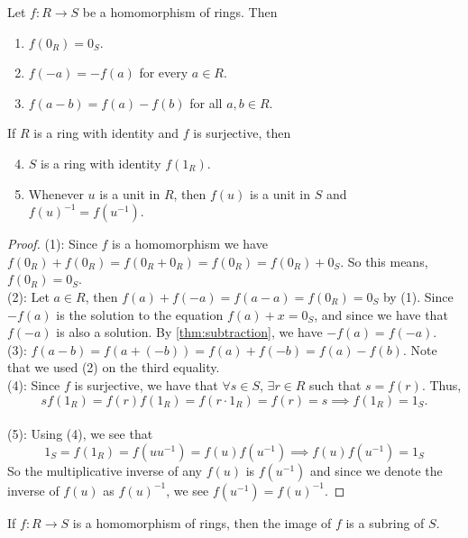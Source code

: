 \documentclass[../main.tex]{subfiles}
\begin{document}
\begin{theorem}\label{thm:homomorphism property}
Let $f: R \to S$ be a homomorphism of rings. Then
\begin{enumerate}
    \item $f(0_R) = 0_S$.
    \item $f(-a) = -f(a)$ for every $a \in R$.
    \item $f(a - b) = f(a) - f(b)$ for all $a, b \in R$.
\end{enumerate}
If $R$ is a ring with identity and $f$ is surjective, then
\begin{enumerate}
    \setcounter{enumi}{3}
    \item $S$ is a ring with identity $f(1_R)$.
    \item Whenever $u$ is a unit in $R$, then $f(u)$ is a unit in $S$ and $f(u)^{-1} = f(u^{-1})$.
\end{enumerate}
\end{theorem}

\begin{proof}
(1): Since $f$ is a homomorphism we have $f(0_R) + f(0_R) = f(0_R + 0_R) = f(0_R) = f(0_R) + 0_S$.
So this means, $f(0_R) = 0_S$.\\
(2): Let $a \in R$, then $f(a) + f(-a) = f(a-a) = f(0_R) = 0_S$ by (1).
Since $-f(a)$ is the solution to the equation $f(a) + x = 0_S$, and since 
we have that $f(-a)$ is also a solution. By \ref{thm:subtraction}, we have $-f(a) = f(-a)$.\\
(3): $ f(a-b) = f(a + (-b)) = f(a) + f(-b) = f(a) - f(b)$. Note that we used (2) on the third equality.\\
(4): Since $f$ is surjective, we have that $\forall s \in S$, $\exists r \in R$ such that
$s = f(r)$. Thus, \[
sf(1_R) = f(r)f(1_R) = f(r\cdot 1_R) = f(r) = s \implies f(1_R) = 1_S.
\]\\
(5): Using (4), we see that\[
1_S = f(1_R) = f(uu^{-1}) = f(u)f(u^{-1}) \implies f(u)f(u^{-1}) = 1_S
\]
So the multiplicative inverse of any $f(u)$ is $f(u^{-1})$ and since 
we denote the inverse of $f(u)$ as $f(u)^{-1}$, we see $f(u^{-1}) = f(u)^{-1}$.




\end{proof}











\begin{corollary}
If $f: R \to S$ is a homomorphism of rings, then the image of $f$ is a subring of $S$.
\end{corollary}
\end{document}
